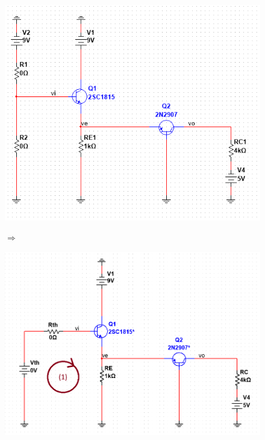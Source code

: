 \begin{figure}[H]
	\centering
	\begin{minipage}{.4\linewidth}
		\includegraphics[width=\linewidth]{./my-chapters/my-images/Question5/b_phancuc_R1_R2.png}
	\end{minipage}
	\begin{minipage}{.1\linewidth}
		$\Rightarrow$
	\end{minipage}
	\begin{minipage}{.4\linewidth}
		\includegraphics[width=\linewidth]{./my-chapters/my-images/Question5/b_phancuc_thevenin.png}
	\end{minipage}
\end{figure}

